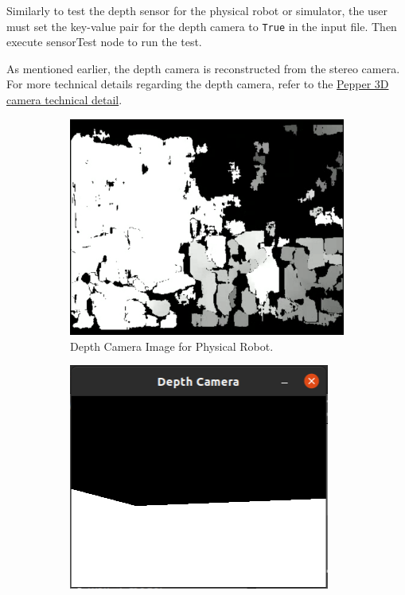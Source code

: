 \documentclass{CSSRforAfrica}
\begin{document}
Similarly to test the depth sensor for the physical robot or simulator, the user must set the key-value pair for the depth 
camera to \texttt{True} in the input file. Then execute sensorTest node to run the test.

As mentioned earlier, the depth camera is reconstructed from the stereo camera. For more technical details regarding the depth camera, 
refer to the \href{http://doc.aldebaran.com/2-5/family/pepper_technical/video_2D_pep.html#d-camera-pepper}{Pepper 3D camera technical detail}.

\begin{figure}[!hbpt]
    \centering
    \begin{subfigure}[b]{0.45\linewidth}
          \includegraphics[width=\linewidth]{images/depthCamera.png}
          \caption{Depth Camera Image for Physical Robot.}
          \label{fig:Physical Depth Camera Image}
        \end{subfigure}
    \hfill
    \begin{subfigure}[b]{0.45\linewidth}
          \includegraphics[width=\linewidth]{images/depthCameraSimulator.png}

\end{subfigure}
\end{figure}
\end{document}
